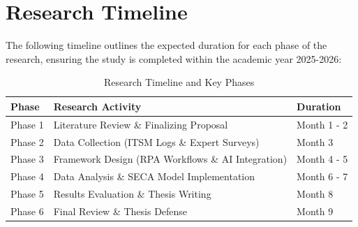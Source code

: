 \documentclass[12pt,a4paper,oneside]{report}
\begin{document}
\section{Research Timeline}
The following timeline outlines the expected duration for each phase of the research, ensuring the study is completed within the academic year 2025-2026:

\begin{table}[h!]
\centering
\caption{Research Timeline and Key Phases}
\begin{tabular}{lll}
\toprule
\textbf{Phase} & \textbf{Research Activity} & \textbf{Duration} \\
\midrule
Phase 1 & Literature Review \& Finalizing Proposal & Month 1 - 2 \\
Phase 2 & Data Collection (ITSM Logs \& Expert Surveys) & Month 3 \\
Phase 3 & Framework Design (RPA Workflows \& AI Integration) & Month 4 - 5 \\
Phase 4 & Data Analysis \& SECA Model Implementation & Month 6 - 7 \\
Phase 5 & Results Evaluation \& Thesis Writing & Month 8 \\
Phase 6 & Final Review \& Thesis Defense & Month 9 \\
\bottomrule
\end{tabular}
\end{table}
\end{document}
